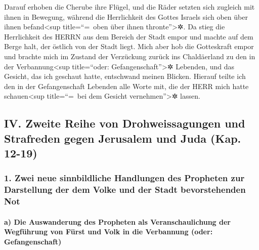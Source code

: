 Darauf erhoben die Cherube ihre Flügel, und die Räder
setzten sich zugleich mit ihnen in Bewegung, während die Herrlichkeit
des Gottes Israels sich oben über ihnen befand\textless sup
title=``=~oben über ihnen thronte''\textgreater✲. Da
stieg die Herrlichkeit des HERRN aus dem Bereich der Stadt empor und
machte auf dem Berge halt, der östlich von der Stadt liegt.
Mich aber hob die Gotteskraft empor und brachte mich im
Zustand der Verzückung zurück ins Chaldäerland zu den in der
Verbannung\textless sup title=``oder: Gefangenschaft''\textgreater✲
Lebenden, und das Gesicht, das ich geschaut hatte, entschwand meinen
Blicken. Hierauf teilte ich den in der Gefangenschaft
Lebenden alle Worte mit, die der HERR mich hatte schauen\textless sup
title=``=~bei dem Gesicht vernehmen''\textgreater✲ lassen.

\hypertarget{iv.-zweite-reihe-von-drohweissagungen-und-strafreden-gegen-jerusalem-und-juda-kap.-12-19}{%
\subsection{IV. Zweite Reihe von Drohweissagungen und Strafreden gegen
Jerusalem und Juda (Kap.
12-19)}\label{iv.-zweite-reihe-von-drohweissagungen-und-strafreden-gegen-jerusalem-und-juda-kap.-12-19}}

\hypertarget{zwei-neue-sinnbildliche-handlungen-des-propheten-zur-darstellung-der-dem-volke-und-der-stadt-bevorstehenden-not}{%
\subsubsection{1. Zwei neue sinnbildliche Handlungen des Propheten zur
Darstellung der dem Volke und der Stadt bevorstehenden
Not}\label{zwei-neue-sinnbildliche-handlungen-des-propheten-zur-darstellung-der-dem-volke-und-der-stadt-bevorstehenden-not}}

\hypertarget{a-die-auswanderung-des-propheten-als-veranschaulichung-der-wegfuxfchrung-von-fuxfcrst-und-volk-in-die-verbannung-oder-gefangenschaft}{%
\paragraph{a) Die Auswanderung des Propheten als Veranschaulichung der
Wegführung von Fürst und Volk in die Verbannung (oder:
Gefangenschaft)}\label{a-die-auswanderung-des-propheten-als-veranschaulichung-der-wegfuxfchrung-von-fuxfcrst-und-volk-in-die-verbannung-oder-gefangenschaft}}

